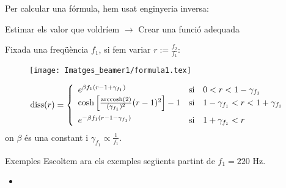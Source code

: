 \documentclass[10pt,hyperref={colorlinks,linkcolor=black,citecolor=blue,urlcolor=blue!70},handout]{beamer}
\DeclareMathOperator{\diss}{diss}
\DeclareMathOperator{\arccosh}{arccosh}
\begin{document}
\begin{frame}
    Per calcular una fórmula, hem usat enginyeria inversa:\par
    \begin{center}
        Estimar els valor que voldríem $\longrightarrow$ Crear una funció adequada
    \end{center}\pause
    Fixada una freqüència $f_1$, si fem variar $r:=\frac{f_2}{f_1}$:\pause
    \begin{figure}
        \centering
        \texttt{[image: Imatges\_beamer1/formula1.tex]}
    \end{figure}\pause
 \scriptsize{$$\diss(r)=
    \left\{\begin{array}{lll}
        e^{\beta f_1(r-1+\gamma_{f_1})} & \text{si} & 0<r<1-\gamma_{f_1}\\
        \cosh\left[\frac{\arccosh(2)}{(\gamma_{f_1})^2}(r-1)^2\right]-1 & \text{si} & 1-\gamma_{f_1}<r<1+\gamma_{f_1}\vspace{5pt}\\
        e^{-\beta f_1(r-1-\gamma_{f_1})} & \text{si} & 1+\gamma_{f_1}<r
    \end{array}\right.$$ on $\beta$ és una constant i $\gamma_{f_1}\propto\frac{1}{f_1}$.}
\end{frame}
\begin{frame}{Exemples}
    Escoltem ara els exemples següents partint de $f_1=220\text{ Hz}$.
    \begin{itemize}
        \item{}
    \end{itemize}
\end{frame}
\end{document}
